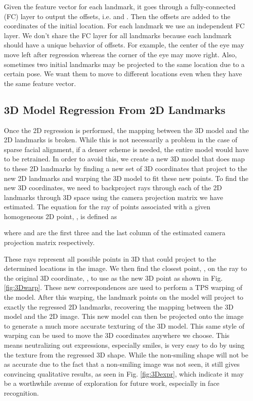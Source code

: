 \documentclass[10pt,twocolumn,letterpaper]{article}
\begin{document}
Given the feature vector for each landmark, it goes through a fully-connected (FC) layer to output the offsets, i.e.  and . Then the offsets are added to the coordinates of the initial location. For each landmark we use an independent FC layer. We don't share the FC layer for all landmarks because each landmark should have a unique behavior of offsets. For example, the center of the eye may move left after regression whereas the corner of the eye may move right. Also, sometimes two initial landmarks may be projected to the same location due to a certain pose. We want them to move to different locations even when they have the same feature vector.

\subsection{3D Model Regression From 2D Landmarks}

Once the 2D regression is performed, the mapping between the 3D model and the 2D landmarks is broken. While this is not necessarily a problem in the case of sparse facial alignment, if a denser scheme is needed, the entire model would have to be retrained. In order to avoid this, we create a new 3D model that does map to these 2D landmarks by finding a new set of 3D coordinates that project to the new 2D landmarks and warping the 3D model to fit these new points. To find the new 3D coordinates, we need to backproject rays through each of the 2D landmarks through 3D space using the camera projection matrix we have estimated. The equation for the ray of points associated with a given homogeneous 2D point, , is defined as

where  and  are the first three and the last column of the estimated camera projection matrix respectively.

These rays represent all possible points in 3D that could project to the determined locations in the image. We then find the closest point, , on the ray to the original 3D coordinate, , to use as the new 3D point as shown in Fig. \ref{fig:3Dwarp}. These new correspondences are used to perform a TPS warping of the model. After this warping, the landmark points on the model will project to exactly the regressed 2D landmarks, recovering the mapping between the 3D model and the 2D image. This new model can then be projected onto the image to generate a much more accurate texturing of the 3D model. This same style of warping can be used to move the 3D coordinates anywhere we choose. This means neutralizing out expressions, especially smiles, is very easy to do by using the texture from the regressed 3D shape. While the non-smiling shape will not be as accurate due to the fact that a non-smiling image was not seen, it still gives convincing qualitative results, as seen in Fig. \ref{fig:3Dexpr}, which indicate it may be a worthwhile avenue of exploration for future work, especially in face recognition.
\end{document}
